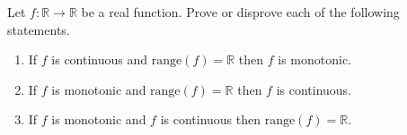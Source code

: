 \documentclass{article}
\begin{document}
\setlength{\parindent}{0pt}
Let $f:\mathbb{R}\to\mathbb{R}$ be a real function. Prove or disprove each of the following statements.
\begin{enumerate}[label=(\alph*)]
\item If $f$ is continuous and $\text{range}(f)=\mathbb{R}$ then $f$ is monotonic.
\item If $f$ is monotonic and $\text{range}(f)=\mathbb{R}$ then $f$ is continuous.
\item If $f$ is monotonic and $f$ is continuous then $\text{range}(f)=\mathbb{R}$.
\end{enumerate}
\end{document}
